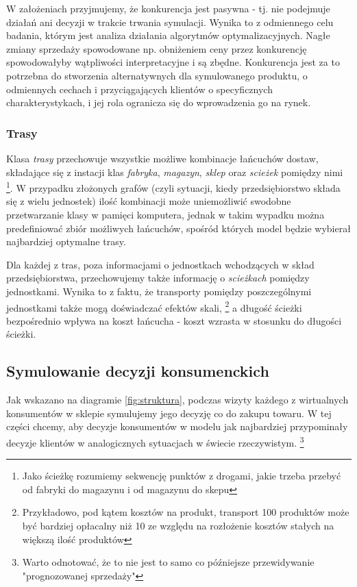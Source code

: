 \documentclass[polish, twoside, 12pt, a4paper]{article}
\theoremstyle{definition}
\theoremstyle{plain}
\theoremstyle{remark}
\begin{document}
W założeniach przyjmujemy, że konkurencja jest pasywna - tj. nie podejmuje działań ani decyzji w trakcie trwania symulacji. Wynika to z odmiennego celu badania, którym jest analiza działania algorytmów optymalizacyjnych. Nagłe zmiany sprzedaży spowodowane np. obniżeniem ceny przez konkurencję spowodowałyby wątpliwości interpretacyjne i są zbędne. Konkurencja jest za to potrzebna do stworzenia alternatywnych dla symulowanego produktu, o odmiennych cechach i przyciągających klientów o specyficznych charakterystykach, i jej rola ogranicza się do wprowadzenia go na rynek.

\subsubsection{Trasy}

Klasa \textit{trasy} przechowuje wszystkie możliwe kombinacje łańcuchów dostaw, składające się z instacji klas \textit{fabryka}, \textit{magazyn}, \textit{sklep} oraz \textit{scieżek} pomiędzy nimi \footnote{Jako ścieżkę rozumiemy sekwencję punktów z drogami, jakie trzeba przebyć od fabryki do magazynu i od magazynu do skepu}. W przypadku złożonych grafów (czyli sytuacji, kiedy przedsiębiorstwo składa się z wielu jednostek) ilość kombinacji może uniemożliwić swodobne przetwarzanie klasy w pamięci komputera, jednak w takim wypadku można predefiniować zbiór możliwych łańcuchów, spośród których model będzie wybierał najbardziej optymalne trasy. 

Dla każdej z tras, poza informacjami o jednostkach wchodzących w skład przedsiębiorstwa, przechowujemy także informację o \textit{scieżkach} pomiędzy jednostkami. Wynika to z faktu, że transporty pomiędzy poszczególnymi jednostkami także mogą doświadczać efektów skali, \footnote{Przykładowo, pod kątem kosztów na produkt, transport 100 produktów może być bardziej opłacalny niż 10  ze względu na rozłożenie kosztów stałych na większą ilość produktów} a długość ścieżki bezpośrednio wpływa na koszt łańcucha - koszt wzrasta w stosunku do długości ścieżki.

\subsection{Symulowanie decyzji konsumenckich} \label{chapter:customerresearch}

Jak wskazano na diagramie \ref{fig:struktura}, podczas wizyty każdego z wirtualnych konsumentów w sklepie symulujemy jego decyzję co do zakupu towaru. W tej części chcemy, aby decyzje konsumentów w modelu jak najbardziej przypominały decyzje klientów w analogicznych sytuacjach w świecie rzeczywistym. \footnote{Warto odnotować, że to nie jest to samo co późniejsze przewidywanie "prognozowanej sprzedaży"} 
\end{document}
